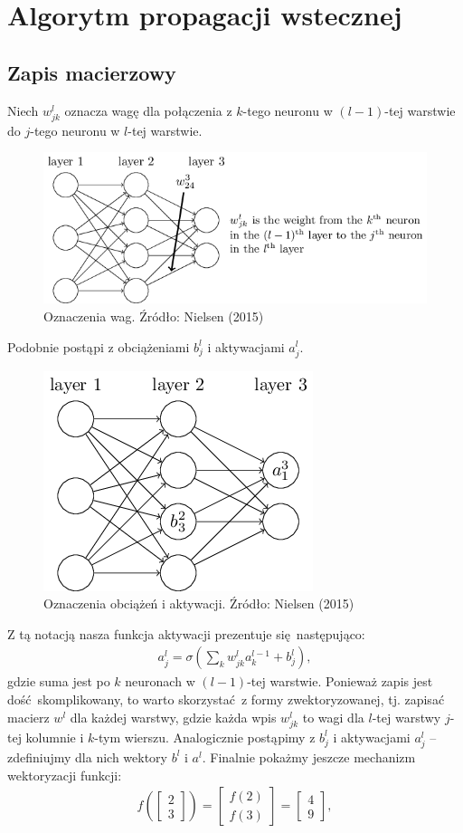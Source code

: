 \documentclass[10pt, oneside]{article}
\theoremstyle{remark}
\begin{document}
\section{Algorytm propagacji wstecznej}

\subsection{Zapis macierzowy}
Niech $w_{jk}^{l}$ oznacza wagę dla połączenia z $k$-tego neuronu w $(l-1)$-tej warstwie do $j$-tego neuronu w $l$-tej warstwie.
\begin{figure}[!htpb]
	\centering
	\includegraphics[width=.7\linewidth]{figures/tikz16}
	\caption{Oznaczenia wag. Źródło: Nielsen (2015)}
\end{figure}
Podobnie postąpi z obciążeniami $b_j^l$ i aktywacjami $a_j^l$.
\begin{figure}[!htpb]
	\centering
	\includegraphics[width=.3\linewidth]{figures/tikz17}
	\caption{Oznaczenia obciążeń i aktywacji. Źródło: Nielsen (2015)}
\end{figure}
Z tą notacją nasza funkcja aktywacji prezentuje się następująco:
\begin{eqnarray} 
  a^{l}_j = \sigma\left( \sum_k w^{l}_{jk} a^{l-1}_k + b^l_j \right),
\end{eqnarray}
gdzie suma jest po $k$ neuronach w $(l-1)$-tej warstwie.
Ponieważ zapis jest dość skomplikowany, to warto skorzystać z formy zwektoryzowanej, tj. zapisać macierz $w^l$ dla każdej warstwy, gdzie każda wpis $w^{l}_{jk}$ to wagi dla $l$-tej warstwy $j$-tej kolumnie i $k$-tym wierszu.
Analogicznie postąpimy z $b_j^l$ i aktywacjami $a_j^l$ -- zdefiniujmy dla nich wektory $b^l$ i $a^l$.
Finalnie pokażmy jeszcze mechanizm wektoryzacji funkcji:
\begin{eqnarray}
  f\left(\left[ \begin{array}{c} 2 \\ 3 \end{array} \right] \right)
  = \left[ \begin{array}{c} f(2) \\ f(3) \end{array} \right]
  = \left[ \begin{array}{c} 4 \\ 9 \end{array} \right],
\end{eqnarray}
\end{document}
